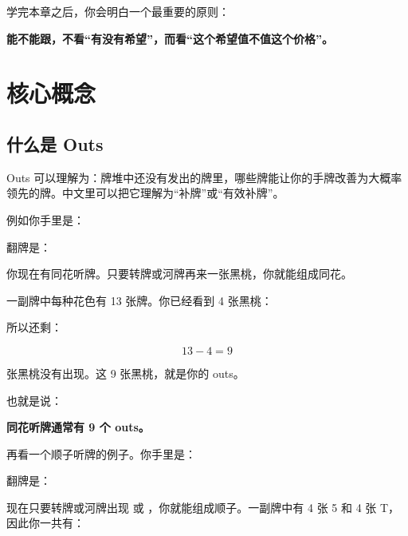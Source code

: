 学完本章之后，你会明白一个最重要的原则：

\begin{center}
\textbf{能不能跟，不看“有没有希望”，而看“这个希望值不值这个价格”。}
\end{center}

\section{核心概念}

\subsection{什么是 Outs}

Outs 可以理解为：牌堆中还没有发出的牌里，哪些牌能让你的手牌改善为大概率领先的牌。中文里可以把它理解为“补牌”或“有效补牌”。

例如你手里是：

\begin{center}
\end{center}

翻牌是：

\begin{center}
\end{center}

你现在有同花听牌。只要转牌或河牌再来一张黑桃，你就能组成同花。

一副牌中每种花色有 13 张牌。你已经看到 4 张黑桃：

\begin{center}
\end{center}

所以还剩：

\[
13 - 4 = 9
\]

张黑桃没有出现。这 9 张黑桃，就是你的 outs。

也就是说：

\begin{center}
\textbf{同花听牌通常有 9 个 outs。}
\end{center}

再看一个顺子听牌的例子。你手里是：

\begin{center}
\end{center}

翻牌是：

\begin{center}
\end{center}

现在只要转牌或河牌出现  或 ，你就能组成顺子。一副牌中有 4 张 5 和 4 张 T，因此你一共有：


